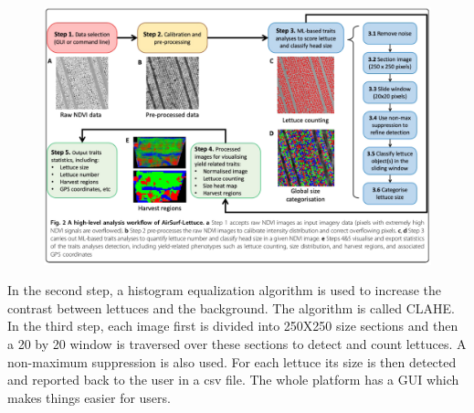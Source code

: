 \documentclass{article}
\begin{document}
\begin{figure}[H]
	\begin{center}
		\includegraphics[width=14cm]{img/1}
	\end{center}
\end{figure}
	
In the second step, a histogram equalization algorithm is used to increase the contrast between lettuces and the background. The algorithm is called CLAHE. In the third step, each image first is divided into 250X250 size sections and then a 20 by 20 window is traversed over these sections to detect and count lettuces. A non-maximum suppression is also used. For each lettuce its size is then detected and reported back to the user in a csv file. The whole platform has a GUI which makes things easier for users. 



	
\end{document}
